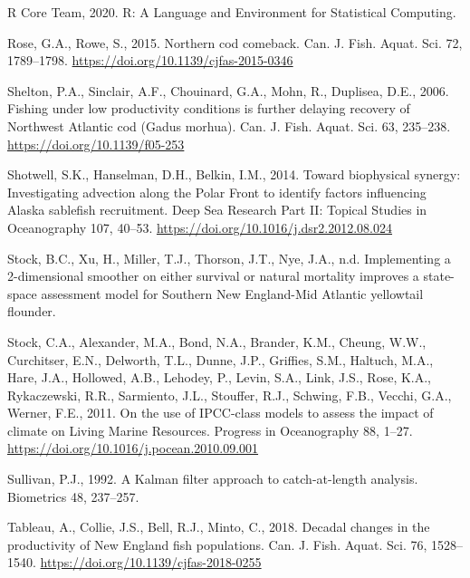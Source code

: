 \documentclass[]{article}
\begin{document}
\leavevmode\hypertarget{ref-rcoreteam2020Language}{}%
R Core Team, 2020. R: A Language and Environment for Statistical
Computing.

\leavevmode\hypertarget{ref-rose2015Northern}{}%
Rose, G.A., Rowe, S., 2015. Northern cod comeback. Can. J. Fish. Aquat.
Sci. 72, 1789--1798. \url{https://doi.org/10.1139/cjfas-2015-0346}

\leavevmode\hypertarget{ref-shelton2006Fishing}{}%
Shelton, P.A., Sinclair, A.F., Chouinard, G.A., Mohn, R., Duplisea,
D.E., 2006. Fishing under low productivity conditions is further
delaying recovery of Northwest Atlantic cod (Gadus morhua). Can. J.
Fish. Aquat. Sci. 63, 235--238. \url{https://doi.org/10.1139/f05-253}

\leavevmode\hypertarget{ref-shotwell2014Biophysical}{}%
Shotwell, S.K., Hanselman, D.H., Belkin, I.M., 2014. Toward biophysical
synergy: Investigating advection along the Polar Front to identify
factors influencing Alaska sablefish recruitment. Deep Sea Research Part
II: Topical Studies in Oceanography 107, 40--53.
\url{https://doi.org/10.1016/j.dsr2.2012.08.024}

\leavevmode\hypertarget{ref-stockthisissueImplementing}{}%
Stock, B.C., Xu, H., Miller, T.J., Thorson, J.T., Nye, J.A., n.d.
Implementing a 2-dimensional smoother on either survival or natural
mortality improves a state-space assessment model for Southern New
England-Mid Atlantic yellowtail flounder.

\leavevmode\hypertarget{ref-stock2011Use}{}%
Stock, C.A., Alexander, M.A., Bond, N.A., Brander, K.M., Cheung, W.W.,
Curchitser, E.N., Delworth, T.L., Dunne, J.P., Griffies, S.M., Haltuch,
M.A., Hare, J.A., Hollowed, A.B., Lehodey, P., Levin, S.A., Link, J.S.,
Rose, K.A., Rykaczewski, R.R., Sarmiento, J.L., Stouffer, R.J., Schwing,
F.B., Vecchi, G.A., Werner, F.E., 2011. On the use of IPCC-class models
to assess the impact of climate on Living Marine Resources. Progress in
Oceanography 88, 1--27.
\url{https://doi.org/10.1016/j.pocean.2010.09.001}

\leavevmode\hypertarget{ref-sullivan1992Kalman}{}%
Sullivan, P.J., 1992. A Kalman filter approach to catch-at-length
analysis. Biometrics 48, 237--257.

\leavevmode\hypertarget{ref-tableau2018Decadal}{}%
Tableau, A., Collie, J.S., Bell, R.J., Minto, C., 2018. Decadal changes
in the productivity of New England fish populations. Can. J. Fish.
Aquat. Sci. 76, 1528--1540.
\url{https://doi.org/10.1139/cjfas-2018-0255}
\end{document}

